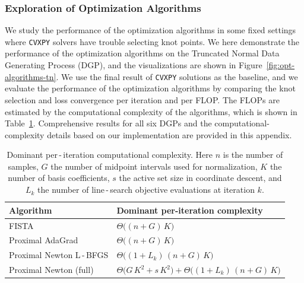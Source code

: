 \subsubsection{Exploration of Optimization Algorithms} \label{subsct: exploration_of_optimization_algorithms}
We study the performance of the optimization algorithms in some fixed settings where \texttt{CVXPY} solvers have trouble selecting knot points. We here demonstrate the performance of the optimization algorithms on the Truncated Normal Data Generating Process (DGP), and the visualizations are shown in Figure~\ref{fig:opt-algorithms-tn}. We use the final result of \texttt{CVXPY} solutions as the baseline, and we evaluate the performance of the optimization algorithms by comparing the knot selection and loss convergence per iteration and per FLOP. The FLOPs are estimated by the computational complexity of the algorithms, which is shown in Table~\ref{tab:complexity-summary}. Comprehensive results for all six DGPs and the computational-complexity details based on our implementation are provided in this appendix.

\begin{table}[tbp]
   \centering
   \begin{tabular}{ll}
   \toprule
   Algorithm & Dominant per-iteration complexity \\
   \midrule
   FISTA & $\Theta\big((n + G)\,K\big)$ \\
   Proximal AdaGrad & $\Theta\big((n + G)\,K\big)$ \\
   Proximal Newton L\,-\,BFGS & $\Theta\big((1+L_k)\,(n + G)\,K\big)$ \\
   Proximal Newton (full) & $\Theta\big(G\,K^2 + s\,K^2\big) + \Theta\big((1+L_k)\,(n + G)\,K\big)$ \\
   \bottomrule
   \end{tabular}
   \caption{Dominant per\,-\,iteration computational complexity. Here $n$ is the number of samples, $G$ the number of midpoint intervals used for normalization, $K$ the number of basis coefficients, $s$ the active set size in coordinate descent, and $L_k$ the number of line\,-\,search objective evaluations at iteration $k$.}
   \label{tab:complexity-summary}
   \end{table}


